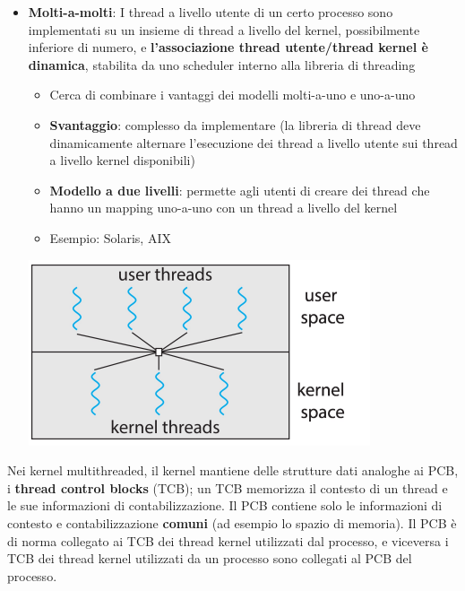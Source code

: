 \documentclass[12pt]{article}
\begin{document}
\begin{itemize}
\begin{center}
    \end{center}
    \item \textbf{Molti-a-molti}: I thread a livello utente di un certo processo sono implementati su un insieme di thread a livello del kernel, possibilmente inferiore di numero, e \textbf{l'associazione thread utente/thread kernel è dinamica}, stabilita da uno scheduler interno alla libreria di threading
    \begin{itemize}
        \item Cerca di combinare i vantaggi dei modelli molti-a-uno e  uno-a-uno
        \item \textbf{Svantaggio}: complesso da implementare (la libreria di thread deve dinamicamente alternare l'esecuzione dei thread a livello utente sui thread a livello kernel disponibili)
        \item \textbf{Modello a due livelli}: permette agli utenti di creare dei thread che hanno un mapping uno-a-uno con un thread a livello del kernel
        \item Esempio: Solaris, AIX
    \end{itemize}
    \begin{center}
        \includegraphics[width = 0.40\linewidth]{Images/44.png}
    \end{center}
\end{itemize}
Nei kernel multithreaded, il kernel mantiene delle strutture dati analoghe ai PCB, i \textbf{thread control blocks} (TCB); un TCB memorizza il
contesto di un thread e le sue informazioni di contabilizzazione.
Il PCB contiene solo le informazioni di contesto e contabilizzazione \textbf{comuni} (ad esempio lo spazio di memoria).
Il PCB è di norma collegato ai TCB dei thread kernel utilizzati dal processo, e viceversa i TCB dei thread kernel utilizzati da un processo sono collegati al PCB del processo.
\end{document}
